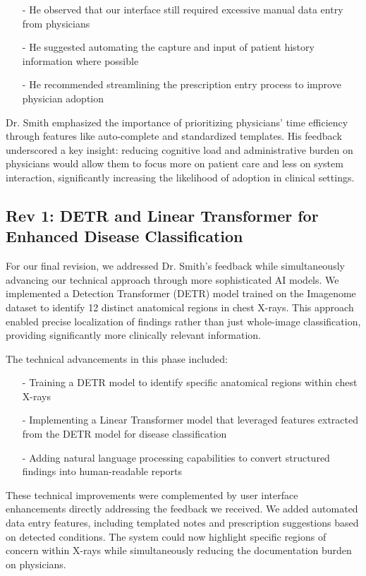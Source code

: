 \documentclass{article}
\begin{document}
\begin{itemize}
    \item[-] He observed that our interface still required excessive manual data entry from physicians
    \item[-] He suggested automating the capture and input of patient history information where possible
    \item[-] He recommended streamlining the prescription entry process to improve physician adoption
\end{itemize}

\noindent Dr. Smith emphasized the importance of prioritizing physicians' time efficiency through features like auto-complete and standardized templates. His feedback underscored a key insight: reducing cognitive load and administrative burden on physicians would allow them to focus more on patient care and less on system interaction, significantly increasing the likelihood of adoption in clinical settings.

\subsection{Rev 1: DETR and Linear Transformer for Enhanced Disease Classification}

For our final revision, we addressed Dr. Smith's feedback while simultaneously advancing our technical approach through more sophisticated AI models. We implemented a Detection Transformer (DETR) model trained on the Imagenome dataset to identify 12 distinct anatomical regions in chest X-rays. This approach enabled precise localization of findings rather than just whole-image classification, providing significantly more clinically relevant information.

\noindent The technical advancements in this phase included:

\begin{itemize}
    \item[-] Training a DETR model to identify specific anatomical regions within chest X-rays
    \item[-] Implementing a Linear Transformer model that leveraged features extracted from the DETR model for disease classification
    \item[-] Adding natural language processing capabilities to convert structured findings into human-readable reports
\end{itemize}

\noindent These technical improvements were complemented by user interface enhancements directly addressing the feedback we received. We added automated data entry features, including templated notes and prescription suggestions based on detected conditions. The system could now highlight specific regions of concern within X-rays while simultaneously reducing the documentation burden on physicians.
\end{document}
